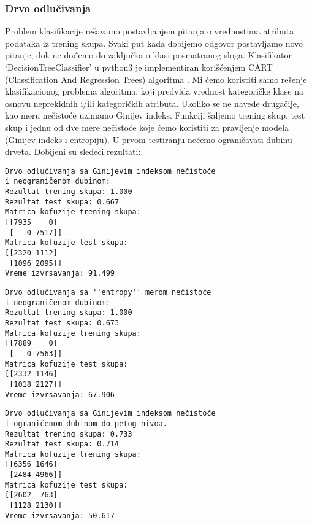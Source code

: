 \documentclass[a4paper]{article}
\begin{document}
\subsubsection{Drvo odlučivanja}
Problem klasifikacije rešavamo postavljanjem pitanja o vrednostima atributa podataka iz
trening skupa. Svaki put kada dobijemo odgovor postavljamo novo pitanje, dok ne dođemo do
zaključka o klasi posmatranog sloga. Klasifikator ‘DecisionTreeClassifier’ u python3 je
implementiran korišćenjem CART (Classification And Regression Trees) algoritma \cite{tree}  .  Mi ćemo
koristiti samo rešenje klasifikacionog problema algoritma, koji predviđa vrednost kategoričke
klase na osnovu neprekidnih i/ili kategoričkih atributa. Ukoliko se ne navede drugačije, kao meru
nečistoće uzimamo Ginijev indeks.
Funkciji šaljemo trening skup, test skup i jednu od dve mere nečistoće koje ćemo koristiti
za pravljenje modela (Ginijev indeks i entropiju). U prvom testiranju nećemo ograničavati dubinu
drveta.
Dobijeni su sledeci rezultati:

\begin{tcolorbox}
\begin{verbatim}
Drvo odlučivanja sa Ginijevim indeksom nečistoće
i neograničenom dubinom:
Rezultat trening skupa: 1.000
Rezultat test skupa: 0.667
Matrica kofuzije trening skupa:
[[7935    0]
 [   0 7517]]
Matrica kofuzije test skupa:
[[2320 1112]
 [1096 2095]]
Vreme izvrsavanja: 91.499
\end{verbatim}
\end{tcolorbox}

\begin{tcolorbox}
\begin{verbatim}
Drvo odlučivanja sa ''entropy'' merom nečistoće
i neograničenom dubinom:
Rezultat trening skupa: 1.000
Rezultat test skupa: 0.673
Matrica kofuzije trening skupa:
[[7889    0]
 [   0 7563]]
Matrica kofuzije test skupa:
[[2332 1146]
 [1018 2127]]
Vreme izvrsavanja: 67.906
\end{verbatim}
\end{tcolorbox}

\begin{tcolorbox}
\begin{verbatim}
Drvo odlučivanja sa Ginijevim indeksom nečistoće
i ograničenom dubinom do petog nivoa.
Rezultat trening skupa: 0.733
Rezultat test skupa: 0.714
Matrica kofuzije trening skupa:
[[6356 1646]
 [2484 4966]]
Matrica kofuzije test skupa:
[[2602  763]
 [1128 2130]]
Vreme izvrsavanja: 50.617
\end{verbatim}
\end{tcolorbox}
\end{document}
